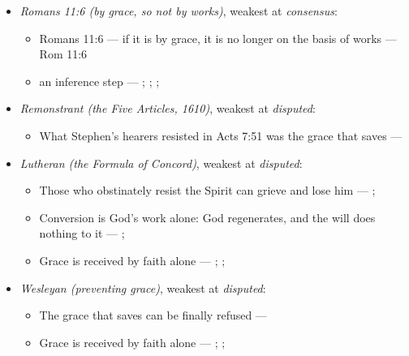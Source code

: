 \documentclass[11pt]{article}
\begin{document}
\begin{itemize}
\item \emph{Romans 11:6 (by grace, so not by works)}, weakest at \emph{consensus}:
\begin{itemize}
\item Romans 11:6 — if it is by grace, it is no longer on the basis of works --- Rom 11:6
\item an inference step --- \cite[Trent, Session VI (1547), ch. 8]{tanner-decrees-1990}; \cite[36]{waterworth-trent-1848}; \cite[Five Arminian Articles (1610), art. 4]{schaff-creeds-christendom-3-1977}; \cite[Canons of Dort, III/IV, art. 10]{schaff-creeds-christendom-3-1977}
\end{itemize}
\item \emph{Remonstrant (the Five Articles, 1610)}, weakest at \emph{disputed}:
\begin{itemize}
\item What Stephen’s hearers resisted in Acts 7:51 was the grace that saves --- \cite[Five Arminian Articles (1610), art. 4]{schaff-creeds-christendom-3-1977}
\end{itemize}
\item \emph{Lutheran (the Formula of Concord)}, weakest at \emph{disputed}:
\begin{itemize}
\item Those who obstinately resist the Spirit can grieve and lose him --- \cite[Solid Declaration II.83]{concordia-triglotta-1921}; \cite[Solid Declaration XI.42]{concordia-triglotta-1921}
\item Conversion is God’s work alone: God regenerates, and the will does nothing to it --- \cite[Solid Declaration II.89]{concordia-triglotta-1921}; \cite[Solid Declaration II.90]{concordia-triglotta-1921}
\item Grace is received by faith alone --- \cite[Augsburg Confession IV.1–3]{concordia-triglotta-1921}; \cite[Sermon 1, III.1]{wesley-sermons-1872}; \cite[Trent, Session VI (1547), canon 9]{tanner-decrees-1990}
\end{itemize}
\item \emph{Wesleyan (preventing grace)}, weakest at \emph{disputed}:
\begin{itemize}
\item The grace that saves can be finally refused --- \cite[397]{wesley-works-9-1827}
\item Grace is received by faith alone --- \cite[Augsburg Confession IV.1–3]{concordia-triglotta-1921}; \cite[Sermon 1, III.1]{wesley-sermons-1872}; \cite[Trent, Session VI (1547), canon 9]{tanner-decrees-1990}

\end{itemize}
\end{itemize}
\end{document}
